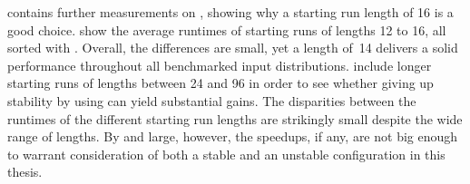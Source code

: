  contains further measurements on \MS{}, showing why a starting run length of 16 is a good choice.
 show the average runtimes of starting runs of lengths 12 to 16, all sorted with \IS{}.
Overall, the differences are small, yet a length of~14 delivers a solid performance throughout all benchmarked input distributions.
 include longer starting runs of lengths between 24 and 96 in order to see whether giving up stability by using \ShS{} can yield substantial gains.
The disparities between the runtimes of the different starting run lengths are strikingly small despite the wide range of lengths.
By and large, however, the speedups, if any, are not big enough to warrant consideration of both a stable and an unstable \MS{} configuration in this thesis.
